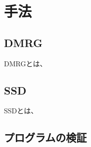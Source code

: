 \chapter{手法}
\section{DMRG}
DMRG\cite{white1992density,white1993density}とは、
\section{SSD}
SSD\cite{gendiar2009spherical,maruyama2011sine}とは、
\section{プログラムの検証}